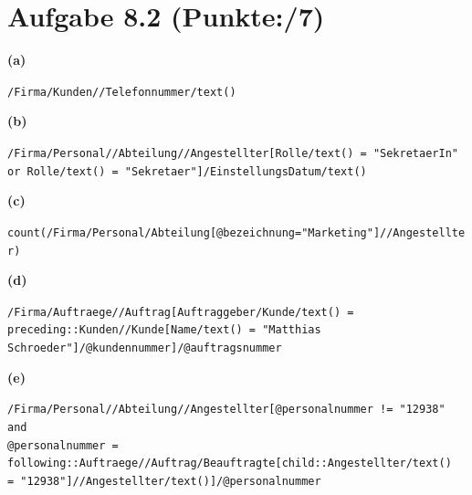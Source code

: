 \documentclass[11pt, a4paper]{article}
\newcommand{\blattnummer}{8}
\newcommand{\pp}{7}
\newcommand{\aufgabe}[2] {\section*{Aufgabe \blattnummer.#1 (Punkte:\qquad/#2)}}
\newcommand{\aufgabenteil}[1] {\textbf{(#1)}}
\begin{document}
\aufgabe{2}{\pp}
\aufgabenteil{a}
\begin{adjustwidth}{20pt}{20pt}
\nolinkurl{/Firma/Kunden//Telefonnummer/text()}
\end{adjustwidth}
\aufgabenteil{b}
\begin{adjustwidth}{20pt}{20pt}
\nolinkurl{/Firma/Personal//Abteilung//Angestellter[Rolle/text() = "SekretaerIn"} \\
\nolinkurl{or Rolle/text() = "Sekretaer"]/EinstellungsDatum/text()}
\end{adjustwidth}
\aufgabenteil{c}
\begin{adjustwidth}{20pt}{20pt}
\nolinkurl{count(/Firma/Personal/Abteilung[@bezeichnung="Marketing"]//Angestellter)}
\end{adjustwidth}
\aufgabenteil{d}
\begin{adjustwidth}{20pt}{20pt}
\nolinkurl{/Firma/Auftraege//Auftrag[Auftraggeber/Kunde/text() = preceding::Kunden//Kunde[Name/text() = "Matthias Schroeder"]/@kundennummer]/@auftragsnummer}
\end{adjustwidth}
\aufgabenteil{e}
\begin{adjustwidth}{20pt}{20pt}
\nolinkurl{/Firma/Personal//Abteilung//Angestellter[@personalnummer != "12938" and} \\
\nolinkurl{@personalnummer = following::Auftraege//Auftrag/Beauftragte[child::Angestellter/text()} \\
\nolinkurl{= "12938"]//Angestellter/text()]/@personalnummer}
\end{adjustwidth}
\end{document}
